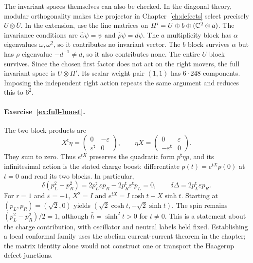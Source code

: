The invariant spaces themselves can also be checked.
In the diagonal theory, modular orthogonality makes the projector
in Chapter~\ref{ch:defects} select precisely
$U\otimes\overline U$. In the extension, use the line matrices
on $H'=U\oplus b\oplus(\mathbb C^2\otimes a)$.
The invariance conditions are
$\widehat\alpha\psi=\psi$ and $\widehat\rho\psi=d\psi$.
The $a$ multiplicity block has $\alpha$ eigenvalues
$\omega,\omega^2$, so it contributes no invariant vector.
The $b$ block survives $\alpha$ but has $\rho$ eigenvalue
$-d^{-1}\ne d$, so it also contributes none.
The entire $U$ block survives. Since the chosen first factor
does not act on the right movers, the full invariant space is
$U\otimes\overline{H'}$. Its scalar weight pair $(1,1)$
has $6\cdot248$ components. Imposing the independent right
action repeats the same argument and reduces this to $6^2$.



\paragraph{Exercise~\ref{ex:full-boost}.}
\label{sol:ex:full-boost}
The two block products are
\[
 X^{\mathsf t}\eta=
 \begin{pmatrix}0&-\varepsilon\\
 \varepsilon^{\mathsf t}&0\end{pmatrix},\qquad
 \eta X=
 \begin{pmatrix}0&\varepsilon\\
 -\varepsilon^{\mathsf t}&0\end{pmatrix}.
\]
They sum to zero. Thus $e^{tX}$ preserves the quadratic
form $p^{\mathsf t}\eta p$, and its infinitesimal action is
the stated charge boost: differentiate $p(t)=e^{tX}p(0)$
at $t=0$ and read its two blocks. In particular,
\[
 \delta(p_L^2-p_R^2)
 =2p_L^{\mathsf t}\varepsilon p_R
  -2p_R^{\mathsf t}\varepsilon^{\mathsf t}p_L=0,
 \qquad
 \delta\Delta=2p_L^{\mathsf t}\varepsilon p_R.
\]
For $r=1$ and $\varepsilon=-1$,
$X^2=I$ and $e^{tX}=I\cosh t+X\sinh t$.
Starting at $(p_L,p_R)=(\sqrt2,0)$ yields
$(\sqrt2\cosh t,-\sqrt2\sinh t)$.
The spin remains $(p_L^2-p_R^2)/2=1$, although
$\bar h=\sinh^2t>0$ for $t\ne0$.
This is a statement about the charge contribution, with oscillator
and neutral labels held fixed. Establishing a local conformal
family uses the abelian current-current theorem in the chapter;
the matrix identity alone would not construct one or transport
the Haagerup defect junctions.


